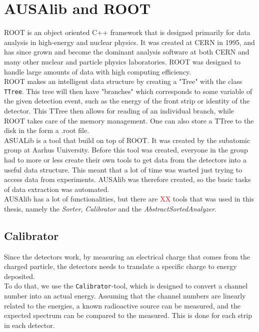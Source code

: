 \section{AUSAlib and ROOT}
ROOT is an object oriented C++ framework that is designed primarily for data analysis in high-energy and nuclear physics. It was created at CERN in 1995, and has since grown and become the dominant analysis software at both CERN and many other nuclear and particle physics laboratories. 
ROOT was designed to handle large amounts of data with high computing efficiency. \\
ROOT makes an intelligent data structure by creating a "Tree" with the class \texttt{TTree}. This tree will then have "branches" which corresponds to some variable of the given detection event, such as the energy of the front strip or identity of the detector. This TTree then allows for reading of an individual branch, while ROOT takes care of the memory management. One can also store a TTree to the disk in the form a .root file. \\

ASUALib is a tool that build on top of ROOT. It was created by the subatomic group at Aarhus University.
Before this tool was created, everyone in the group had to more or less create their own tools to get data from the detectors into a useful data structure. This meant that a lot of time was wasted just trying to access data from experiments. AUSAlib was therefore created, so the basic tasks of data extraction was automated. \\
AUSAlib has a lot of functionalities, but there are \textcolor{red}{XX} tools that was used in this thesis, namely the \textit{Sorter}, \textit{Calibrator} and the \textit{AbstractSortedAnalyzer}.

\subsection{Calibrator}
Since the detectors work, by measuring an electrical charge that comes from the charged particle, the detectors needs to translate a specific charge to energy deposited. \\
To do that, we use the \texttt{Calibrator}-tool, which is designed to convert a channel number into an actual energy. Assuming that the channel numbers are linearly related to the energies, a known radioactive source can be measured, and the expected spectrum can be compared to the measured. This is done for each strip in each detector.
\\\\

